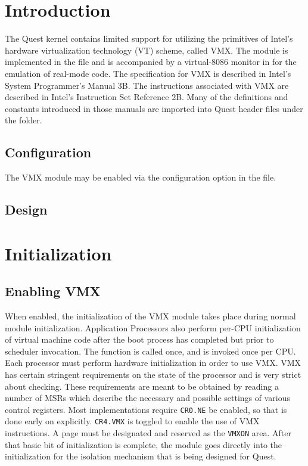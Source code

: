 \documentclass[twocolumn]{article}
\newcommand\func[1]{{\path {#1}}}
\newcommand\optn[1]{{\path {#1}}}
\newcommand\bit[2]{{\tt {#1}.{#2}}}
\newcommand\inst[1]{{\tt {#1}}}
\begin{document}
\section{Introduction}
The Quest kernel contains limited support for utilizing the primitives
of Intel's hardware virtualization technology (VT) scheme, called VMX.
The module is implemented in the  file and is
accompanied by a virtual-8086 monitor in  for the
emulation of real-mode code.  The specification for VMX is described
in Intel's System Programmer's Manual 3B.  The instructions associated
with VMX are described in Intel's Instruction Set Reference 2B.  Many
of the definitions and constants introduced in those manuals are
imported into Quest header files under the  folder.

\subsection{Configuration}
The VMX module may be enabled via the configuration option
\optn{USE_VMX} in the  file.

\subsection{Design}

\section{Initialization}
\subsection{Enabling VMX}
When enabled, the initialization of the VMX module takes place during
normal module initialization.  Application Processors also perform
per-CPU initialization of virtual machine code after the boot process
has completed but prior to scheduler invocation.  The function
\func{vmx_global_init} is called once, and \func{vmx_processor_init}
is invoked once per CPU.  Each processor must perform hardware
initialization in order to use VMX. VMX has certain stringent
requirements on the state of the processor and is very strict about
checking.  These requirements are meant to be obtained by reading a
number of MSRs which describe the necessary and possible settings of
various control registers.  Most implementations require \bit{CR0}{NE}
be enabled, so that is done early on explicitly.  \bit{CR4}{VMX} is
toggled to enable the use of VMX instructions.  A page must be
designated and reserved as the \inst{VMXON} area.  After that basic
bit of initialization is complete, the module goes directly into the
initialization for the isolation mechanism that is being designed for
Quest.
\end{document}
